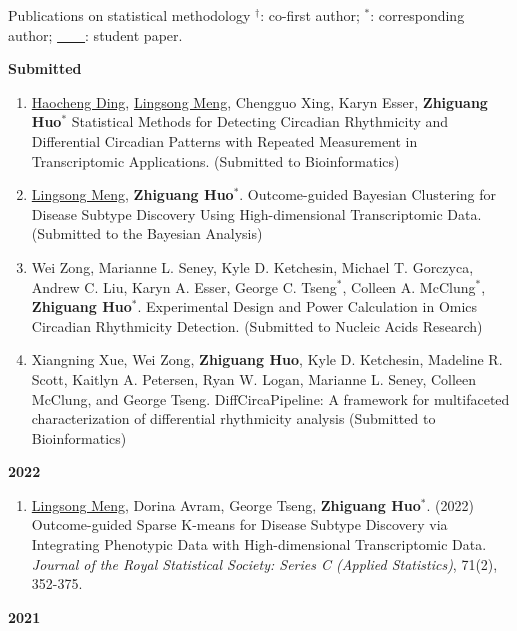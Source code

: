 \documentclass{resume} %
\begin{document}
\begin{rSection}{Publications on statistical methodology}
$^\dagger$: co-first author; $^*$: corresponding author; \underline{\mbox{ }\mbox{ }\mbox{ }\mbox{ }}: student paper.

\textbf{Submitted}
\begin{enumerate}[noitemsep,topsep=0pt]

\item \underline{Haocheng Ding}, \underline{Lingsong Meng}, Chengguo Xing, Karyn Esser, {\bf Zhiguang Huo}$^*$
Statistical Methods for Detecting Circadian Rhythmicity and Differential Circadian Patterns with Repeated Measurement in Transcriptomic Applications.
(Submitted to Bioinformatics)

\item
\underline{Lingsong Meng}, {\bf Zhiguang Huo}$^*$. Outcome-guided Bayesian Clustering for Disease Subtype Discovery Using High-dimensional Transcriptomic Data. 
(Submitted to the Bayesian Analysis)

\item
Wei Zong, Marianne L. Seney, Kyle D. Ketchesin, Michael T. Gorczyca, Andrew C. Liu, Karyn A. Esser, George C. Tseng$^*$, Colleen A. McClung$^*$,  {\bf Zhiguang Huo}$^*$. 
Experimental Design and Power Calculation in Omics Circadian Rhythmicity Detection. 
(Submitted to Nucleic Acids Research)

\item Xiangning Xue, Wei Zong, {\bf Zhiguang Huo}, Kyle D. Ketchesin, Madeline R. Scott, Kaitlyn A. Petersen, Ryan W. Logan, Marianne L. Seney, Colleen McClung, and George Tseng.
DiffCircaPipeline: A framework for multifaceted characterization of differential rhythmicity analysis
(Submitted to Bioinformatics)
\end{enumerate}


\textbf{2022}
\begin{enumerate}[noitemsep,topsep=0pt, resume]

\item
\underline{Lingsong Meng}, Dorina Avram, George Tseng, {\bf Zhiguang Huo}$^*$.  (2022)
Outcome-guided Sparse K-means for Disease Subtype Discovery via Integrating Phenotypic Data with High-dimensional Transcriptomic Data.
\emph{Journal of the Royal Statistical Society: Series C (Applied Statistics)}, 71(2), 352-375.

\end{enumerate}


\textbf{2021}
\begin{enumerate}[noitemsep,topsep=0pt, resume]


\end{enumerate}
\end{rSection}
\end{document}
